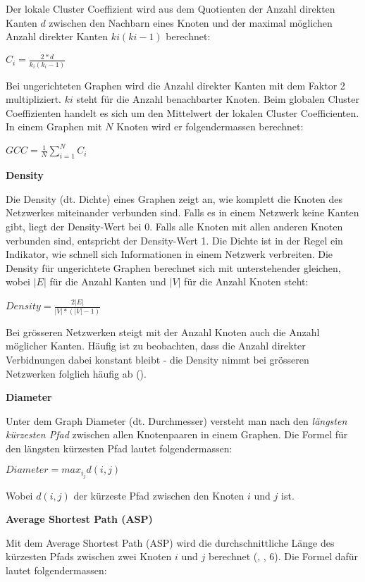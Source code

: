 Der lokale Cluster Coeffizient wird aus dem Quotienten der Anzahl direkten Kanten $d$ zwischen den Nachbarn eines Knoten und der maximal möglichen Anzahl direkter Kanten $ki(ki -1)$ berechnet:

$C_i = \frac{2*d}{k_i(k_i-1)}$

Bei ungerichteten Graphen wird die Anzahl direkter Kanten mit dem Faktor 2 multipliziert. $ki$ steht für die Anzahl benachbarter Knoten.
Beim globalen Cluster Coeffizienten handelt es sich um den Mittelwert der lokalen Cluster Coefficienten.
In einem Graphen mit $N$ Knoten wird er folgendermassen berechnet:

$GCC = \frac{1}{N}\sum\limits_{i=1}^{N}C_i$

\textbf{Density}

Die Density (dt. Dichte) eines Graphen zeigt an, wie komplett die Knoten des Netzwerkes miteinander verbunden sind.
Falls es in einem Netzwerk keine Kanten gibt, liegt der Density-Wert bei 0. Falls alle Knoten mit allen anderen Knoten verbunden sind, entspricht der Density-Wert 1.
Die Dichte ist in der Regel ein Indikator, wie schnell sich Informationen in einem Netzwerk verbreiten.
Die Density für ungerichtete Graphen berechnet sich mit unterstehender gleichen, wobei $|E|$ für die Anzahl Kanten und $|V|$ für die Anzahl Knoten steht:

$Density = \frac{2|E|}{|V|*(|V|-1)}$

Bei grösseren Netzwerken steigt mit der Anzahl Knoten auch die Anzahl möglicher Kanten.
Häufig ist zu beobachten, dass die Anzahl direkter Verbidnungen dabei konstant bleibt - die Density nimmt bei grösseren Netzwerken folglich häufig ab (\cite{michael_henninger_soziale_2018}).

\textbf{Diameter}

Unter dem Graph Diameter (dt. Durchmesser) versteht man nach \cite{michael_henninger_soziale_2018} den \textit{längsten kürzesten Pfad} zwischen allen Knotenpaaren in einem Graphen.
Die Formel für den längsten kürzesten Pfad lautet folgendermassen:

$Diameter = max_i_jd(i,j)$

Wobei $d(i,j)$ der kürzeste Pfad zwischen den Knoten $i$ und $j$ ist.

\textbf{Average Shortest Path (ASP)}

Mit dem Average Shortest Path (ASP) wird die durchschnittliche Länge des kürzesten Pfads zwischen zwei Knoten $i$ und $j$ berechnet (\citeauthor{gao_link_2015}, \citeyear{gao_link_2015}, 6).
Die Formel dafür lautet folgendermassen:

